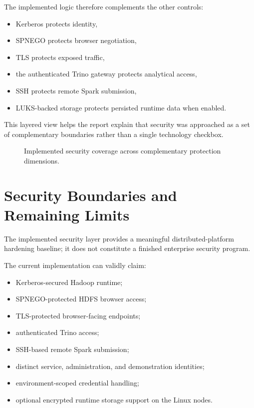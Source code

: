 The implemented logic therefore complements the other controls:
\begin{itemize}
    \item Kerberos protects identity,
    \item SPNEGO protects browser negotiation,
    \item TLS protects exposed traffic,
    \item the authenticated Trino gateway protects analytical access,
    \item SSH protects remote Spark submission,
    \item LUKS-backed storage protects persisted runtime data when enabled.
\end{itemize}

This layered view helps the report explain that security was approached as a set of complementary boundaries rather than a single technology checkbox.

\begin{figure}[H]
    \centering
    
    \caption{Implemented security coverage across complementary protection dimensions.}
    \label{fig:chapter7-security-coverage}
\end{figure}

\section{Security Boundaries and Remaining Limits}
The implemented security layer provides a meaningful distributed-platform hardening baseline; it does not constitute a finished enterprise security program.

The current implementation can validly claim:
\begin{itemize}
    \item Kerberos-secured Hadoop runtime;
    \item SPNEGO-protected HDFS browser access;
    \item TLS-protected browser-facing endpoints;
    \item authenticated Trino access;
    \item SSH-based remote Spark submission;
    \item distinct service, administration, and demonstration identities;
    \item environment-scoped credential handling;
    \item optional encrypted runtime storage support on the Linux nodes.
\end{itemize}

